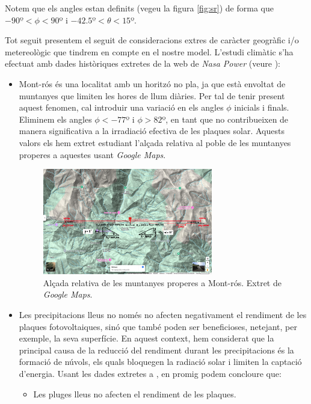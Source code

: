 \documentclass[10pt, twoside, a4paper]{article}
\begin{document}
Notem que els angles estan definits (vegeu la figura \ref{fig:sr}) de forma que $-90\text{º}<\phi < 90$º i $-42.5\text{º} < \theta < 15$º.

Tot seguit presentem el seguit de consideracions extres de caràcter geogràfic i/o metereològic que tindrem en compte en el nostre model. L'estudi climàtic s'ha efectuat amb dades històriques extretes de la web de \textit{Nasa Power} (veure \cite{ref6}):
\begin{itemize}
    \item Mont-rós és una localitat amb un horitzó no pla, ja que està envoltat de muntanyes que limiten les hores de llum diàries. Per tal de tenir present aquest fenomen, cal introduir una variació en els angles $\phi$ inicials i finals. Eliminem els angles $\phi < -77$º i $\phi > 82$º, en tant que no contribueixen de manera significativa a la irradiació efectiva de les plaques solar. Aquests valors els hem extret estudiant l'alçada relativa al poble de les muntanyes properes a aquestes usant \textit{Google Maps}. 
    \begin{figure}[h!]
        \centering
        \includegraphics[width=0.7\textwidth]{MapaMuntanyes.jpg}
        \caption{Alçada relativa de les muntanyes properes a Mont-rós. Extret de \textit{Google Maps}. }
        \label{fig:alçada_muntanyes}
    \end{figure}
    \item Les precipitacions lleus no només no afecten negativament el rendiment de les plaques fotovoltaiques, sinó que també poden ser beneficioses, netejant, per exemple, la seva superfície. En aquest context, hem considerat que la principal causa de la reducció del rendiment durant les precipitacions és la formació de núvols, els quals bloquegen la radiació solar i limiten la captació d'energia. Usant les dades extretes a \cite{ref9}, en promig podem concloure que:
    \begin{itemize}
        \item Les pluges lleus no afecten el rendiment de les plaques.

\end{itemize}
\end{itemize}
\end{document}
